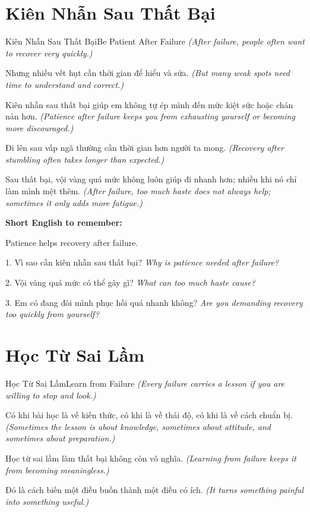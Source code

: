 \section{Kiên Nhẫn Sau Thất Bại}
\begin{truyen}{Kiên Nhẫn Sau Thất Bại}{Be Patient After Failure}
\textit{(After failure, people often want to recover very quickly.)}

Nhưng nhiều vết hụt cần thời gian để hiểu và sửa.
\textit{(But many weak spots need time to understand and correct.)}

Kiên nhẫn sau thất bại giúp em không tự ép mình đến mức kiệt sức hoặc chán nản hơn.
\textit{(Patience after failure keeps you from exhausting yourself or becoming more discouraged.)}

Đi lên sau vấp ngã thường cần thời gian hơn người ta mong.
\textit{(Recovery after stumbling often takes longer than expected.)}
\end{truyen}

\begin{baihoc}
Sau thất bại, vội vàng quá mức không luôn giúp đi nhanh hơn; nhiều khi nó chỉ làm mình mệt thêm.
\textit{(After failure, too much haste does not always help; sometimes it only adds more fatigue.)}
\end{baihoc}

\begin{ghinhoanh}
\textbf{Short English to remember:}

Patience helps recovery after failure.

\end{ghinhoanh}

\begin{tuhocnhanh}
1. Vì sao cần kiên nhẫn sau thất bại? \textit{Why is patience needed after failure?}

2. Vội vàng quá mức có thể gây gì? \textit{What can too much haste cause?}

3. Em có đang đòi mình phục hồi quá nhanh không? \textit{Are you demanding recovery too quickly from yourself?}
\end{tuhocnhanh}
\ngancach

\section{Học Từ Sai Lầm}
\begin{truyen}{Học Từ Sai Lầm}{Learn from Failure}
\textit{(Every failure carries a lesson if you are willing to stop and look.)}

Có khi bài học là về kiến thức, có khi là về thái độ, có khi là về cách chuẩn bị.
\textit{(Sometimes the lesson is about knowledge, sometimes about attitude, and sometimes about preparation.)}

Học từ sai lầm làm thất bại không còn vô nghĩa.
\textit{(Learning from failure keeps it from becoming meaningless.)}

Đó là cách biến một điều buồn thành một điều có ích.
\textit{(It turns something painful into something useful.)}
\end{truyen}

